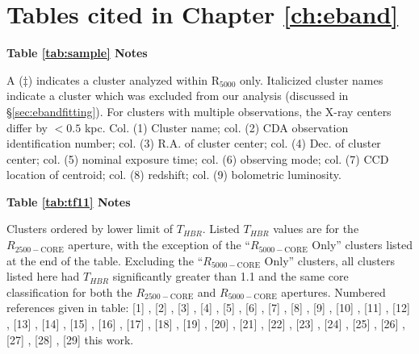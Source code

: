 \chapter{Tables cited in Chapter \ref{ch:eband}}

\begin{center}
{\bf{Table \ref{tab:sample} Notes}}\\
\end{center}
A ($\ddagger$) indicates a cluster analyzed within R$_{5000}$
only. Italicized cluster names indicate a cluster which was excluded
from our analysis (discussed in \S\ref{sec:ebandfitting}). For clusters
with multiple observations, the X-ray centers differ by $< 0.5$ kpc.
Col. (1) Cluster name; col. (2) CDA observation identification number;
col. (3) R.A. of cluster center; col. (4) Dec. of cluster center;
col. (5) nominal exposure time; col. (6) observing mode; col. (7) CCD
location of centroid; col. (8) redshift; col. (9) bolometric
luminosity.

\begin{center}
{\bf{Table \ref{tab:tf11} Notes}}\\
\end{center}
Clusters ordered by lower limit of $T_{HBR}$. Listed $T_{HBR}$ values
are for the $R_{2500-\mathrm{CORE}}$ aperture, with the exception of
the ``$R_{5000-\mathrm{CORE}}$ Only'' clusters listed at the end of
the table. Excluding the ``$R_{5000-\mathrm{CORE}}$ Only'' clusters,
all clusters listed here had $T_{HBR}$ significantly greater than 1.1
and the same core classification for both the $R_{2500-\mathrm{CORE}}$
and $R_{5000-\mathrm{CORE}}$ apertures. Numbered references given in
table: [1] \citet{1994ApJS...94..583G}, [2] \citet{2003ApJ...593..291K},
[3] \citet{2005ChJAA...5..126Y}, [4] \citet{1998ApJ...503...77M}, [5]
\citet{2006Sci...314..791B}, [6] \citet{1990ApJS...72..715T}, [7]
\citet{2004ApJ...607..190A}, [8] \citet{1995ApJ...446..583B}, [9]
\citet{1997A&A...317..432F}, [10] \citet{1997ApJ...490...56G}, [11]
\citet{2002ApJS..139..313D}, [12] \citet{2005MNRAS.359..417S}, [13]
\citet{1982ApJ...255L..17G}, [14] \citet{2004ApJ...610L..81H}, [15]
\citet{2004ApJ...614..692Y}, [16] \citet{2003A&A...408...57M}, [17]
\citet{2000ApJ...540..726G}, [18] \citet{1998ApJ...496L...5T}, [19]
\citet{1999AcA....49..403K}, [20] \citet{2001ApJ...555..205M}, [21]
\citet{2001A&A...379..807G}, [22] \citet{1998MNRAS.301..609B}, [23]
\citet{2005ApJ...619..161G}, [24] \citet{1996ApJ...472L..17M}, [25]
\citet{2001ASPC..251..474O}, [26] \citet{2000ApJ...534L..43M}, [27]
\citet{2004ApJ...616..178C}, [28] \citet{2005xrrc.procE7.08C}, [29] this
work.

